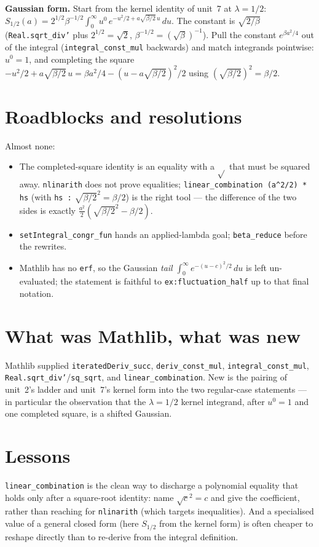 \documentclass[11pt]{article}
\begin{document}
\textbf{Gaussian form.} Start from the kernel identity of unit~7 at $\lambda=1/2$:
$S_{1/2}(a)=2^{1/2}\beta^{-1/2}\int_0^\infty u^{0}\,e^{-u^2/2+a\sqrt{\beta/2}\,u}\,du$. The constant is
$\sqrt{2/\beta}$ (\texttt{Real.sqrt\_div'} plus $2^{1/2}=\sqrt2$, $\beta^{-1/2}=(\sqrt\beta)^{-1}$).
Pull the constant $e^{\beta a^2/4}$ out of the integral (\texttt{integral\_const\_mul} backwards) and
match integrands pointwise: $u^{0}=1$, and completing the square
$-u^2/2+a\sqrt{\beta/2}\,u=\beta a^2/4-(u-a\sqrt{\beta/2})^2/2$ using $(\sqrt{\beta/2})^2=\beta/2$.

\section{Roadblocks and resolutions}
Almost none:
\begin{itemize}
\item The completed-square identity is an equality with a $\sqrt{}$ that must be squared away.
\texttt{nlinarith} does not prove equalities; \texttt{linear\_combination (a\^{}2/2) * hs} (with
\texttt{hs :} $\sqrt{\beta/2}^2=\beta/2$) is the right tool --- the difference of the two sides is
exactly $\tfrac{a^2}{2}(\sqrt{\beta/2}^2-\beta/2)$.
\item \texttt{setIntegral\_congr\_fun} hands an applied-lambda goal; \texttt{beta\_reduce} before the
rewrites.
\item Mathlib has no \texttt{erf}, so the Gaussian \emph{tail} $\int_0^\infty e^{-(u-c)^2/2}\,du$ is
left un-evaluated; the statement is faithful to \texttt{ex:fluctuation\_half} up to that final
notation.
\end{itemize}

\section{What was Mathlib, what was new}
Mathlib supplied \texttt{iteratedDeriv\_succ}, \texttt{deriv\_const\_mul}, \texttt{integral\_const\_mul},
\texttt{Real.sqrt\_div'}/\texttt{sq\_sqrt}, and \texttt{linear\_combination}. New is the pairing of
unit~2's ladder and unit~7's kernel form into the two regular-case statements --- in particular the
observation that the $\lambda=1/2$ kernel integrand, after $u^{0}=1$ and one completed square, is a
shifted Gaussian.

\section{Lessons}
\texttt{linear\_combination} is the clean way to discharge a polynomial equality that holds only after a
square-root identity: name $\sqrt{c}^2=c$ and give the coefficient, rather than reaching for
\texttt{nlinarith} (which targets inequalities). And a specialised value of a general closed form (here
$S_{1/2}$ from the kernel form) is often cheaper to reshape directly than to re-derive from the integral
definition.
\end{document}
